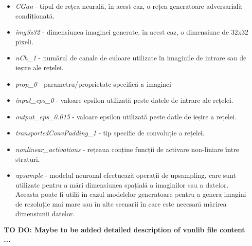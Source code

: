 \begin{itemize}
  \item \textit{CGan} - tipul de rețea neurală, în acest caz, o rețea generatoare adversarială condiționată.
  
  \item \textit{imgSz32} - dimensiunea imaginei generate, în acest caz, o dimensiune de 32x32 pixeli.

  \item \textit{nCh\_1} - numărul de canale de culoare utilizate în imaginile de intrare sau de ieșire ale rețelei.
  
  \item \textit{prop\_0} - parametru/proprietate specifică a imaginei

  \item \textit{input\_eps\_0} - valoare epsilon utilizată peste datele de intrare ale rețelei.
  
  \item \textit{output\_eps\_0.015} -  valoare epsilon utilizată peste datle de ieșire a rețelei.


  \item \textit{transportedConvPadding\_1} - tip specific de convoluție a rețelei.
  
  \item \textit{nonlinear\_activations} - rețeaua conține funcții de activare non-liniare între straturi.

  \item \textit{upsample} - modelul neuronal efectuează operații de upsampling, care sunt utilizate pentru a mări dimensiunea spațială a imaginilor sau a datelor. Aceasta poate fi utilă în cazul modelelor generatoare pentru a genera imagini de rezoluție mai mare sau în alte scenarii în care este necesară mărirea dimensiunii datelor.
  
\end{itemize}

\textbf{TO DO: Maybe to be added detailed description of vnnlib file content ...}